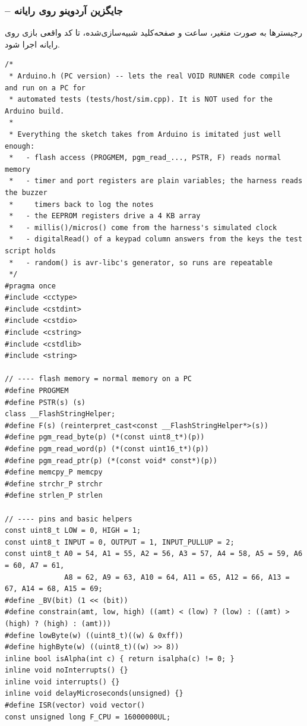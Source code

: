 \documentclass[11pt,a4paper]{article}
\begin{document}
\subsubsection*{ – جایگزین آردوینو روی رایانه}
رجیسترها به صورت متغیر، ساعت و صفحه‌کلید شبیه‌سازی‌شده، تا کد واقعی بازی روی رایانه اجرا شود.

\begin{latin}
\begin{lstlisting}[language=Arduino]
/*
 * Arduino.h (PC version) -- lets the real VOID RUNNER code compile and run on a PC for
 * automated tests (tests/host/sim.cpp). It is NOT used for the Arduino build.
 *
 * Everything the sketch takes from Arduino is imitated just well enough:
 *   - flash access (PROGMEM, pgm_read_..., PSTR, F) reads normal memory
 *   - timer and port registers are plain variables; the harness reads the buzzer
 *     timers back to log the notes
 *   - the EEPROM registers drive a 4 KB array
 *   - millis()/micros() come from the harness's simulated clock
 *   - digitalRead() of a keypad column answers from the keys the test script holds
 *   - random() is avr-libc's generator, so runs are repeatable
 */
#pragma once
#include <cctype>
#include <cstdint>
#include <cstdio>
#include <cstring>
#include <cstdlib>
#include <string>

// ---- flash memory = normal memory on a PC
#define PROGMEM
#define PSTR(s) (s)
class __FlashStringHelper;
#define F(s) (reinterpret_cast<const __FlashStringHelper*>(s))
#define pgm_read_byte(p) (*(const uint8_t*)(p))
#define pgm_read_word(p) (*(const uint16_t*)(p))
#define pgm_read_ptr(p) (*(const void* const*)(p))
#define memcpy_P memcpy
#define strchr_P strchr
#define strlen_P strlen

// ---- pins and basic helpers
const uint8_t LOW = 0, HIGH = 1;
const uint8_t INPUT = 0, OUTPUT = 1, INPUT_PULLUP = 2;
const uint8_t A0 = 54, A1 = 55, A2 = 56, A3 = 57, A4 = 58, A5 = 59, A6 = 60, A7 = 61,
              A8 = 62, A9 = 63, A10 = 64, A11 = 65, A12 = 66, A13 = 67, A14 = 68, A15 = 69;
#define _BV(bit) (1 << (bit))
#define constrain(amt, low, high) ((amt) < (low) ? (low) : ((amt) > (high) ? (high) : (amt)))
#define lowByte(w) ((uint8_t)((w) & 0xff))
#define highByte(w) ((uint8_t)((w) >> 8))
inline bool isAlpha(int c) { return isalpha(c) != 0; }
inline void noInterrupts() {}
inline void interrupts() {}
inline void delayMicroseconds(unsigned) {}
#define ISR(vector) void vector()
const unsigned long F_CPU = 16000000UL;


\end{lstlisting}
\end{latin}
\end{document}
